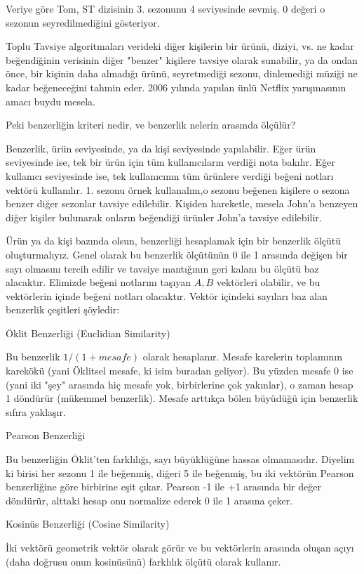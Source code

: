 \documentclass[12pt,fleqn]{article}\usepackage{../../common}
\begin{document}
Veriye göre Tom, ST dizisinin 3. sezonunu 4 seviyesinde sevmiş. 0
değeri o sezonun seyredilmediğini gösteriyor.

Toplu Tavsiye algoritmaları verideki diğer kişilerin bir ürünü, diziyi, vs. ne
kadar beğendiğinin verisinin diğer "benzer" kişilere tavsiye olarak sunabilir,
ya da ondan önce, bir kişinin daha almadığı ürünü, seyretmediği sezonu,
dinlemediği müziği ne kadar beğeneceğini tahmin eder. 2006 yılında yapılan ünlü
Netflix yarışmasının amacı buydu mesela.

Peki benzerliğin kriteri nedir, ve benzerlik nelerin arasında ölçülür?

Benzerlik, ürün seviyesinde, ya da kişi seviyesinde yapılabilir. Eğer ürün
seviyesinde ise, tek bir ürün için tüm kullanıcıların verdiği nota
bakılır. Eğer kullanıcı seviyesinde ise, tek kullanıcının tüm ürünlere
verdiği beğeni notları vektörü kullanılır. 1. sezonu örnek kullanalım,o
sezonu beğenen kişilere o sezona benzer diğer sezonlar tavsiye
edilebilir. Kişiden hareketle, mesela John'a benzeyen diğer kişiler
bulunarak onların beğendiği ürünler John'a tavsiye edilebilir.

Ürün ya da kişi bazında olsun, benzerliği hesaplamak için bir benzerlik
ölçütü oluşturmalıyız. Genel olarak bu benzerlik ölçütünün 0 ile 1 arasında
değişen bir sayı olmasını tercih edilir ve tavsiye mantığının geri kalanı
bu ölçütü baz alacaktır. Elimizde beğeni notlarını taşıyan $A,B$ vektörleri
olabilir, ve bu vektörlerin içinde beğeni notları olacaktır. Vektör
içindeki sayıları baz alan benzerlik çeşitleri şöyledir:

Öklit Benzerliği (Euclidian Similarity)

Bu benzerlik $1 / (1+mesafe)$ olarak hesaplanır. Mesafe karelerin
toplamının karekökü (yani Öklitsel mesafe, ki isim buradan
geliyor). Bu yüzden mesafe 0 ise (yani iki "şey" arasında hiç mesafe
yok, birbirlerine çok yakınlar), o zaman hesap 1 döndürür (mükemmel
benzerlik). Mesafe arttıkça bölen büyüdüğü için benzerlik sıfıra yaklaşır. 

Pearson Benzerliği

Bu benzerliğin Öklit'ten farklılığı, sayı büyüklüğüne hassas olmamasıdır.
Diyelim ki birisi her sezonu 1 ile beğenmiş, diğeri 5 ile beğenmiş, bu iki
vektörün Pearson benzerliğine göre birbirine eşit çıkar. Pearson -1 ile +1
arasında bir değer döndürür, alttaki hesap onu normalize ederek 0 ile 1 arasına
çeker.

Kosinüs Benzerliği (Cosine Similarity)

İki vektörü geometrik vektör olarak görür ve bu vektörlerin arasında
oluşan açıyı (daha doğrusu onun kosinüsünü) farklılık ölçütü olarak
kullanır.
\end{document}
